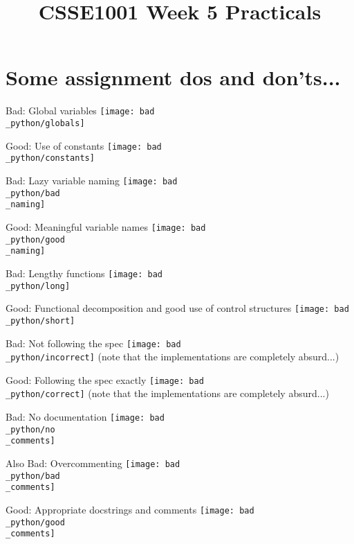 \documentclass[week2]{csse1001}
\title{CSSE1001 Week 5 Practicals}
\begin{document}
\begin{frame} 
\maketitle
\end{frame}

\section{Some assignment dos and don'ts...}

\begin{topic}{Bad: Global variables}
\texttt{[image: bad\\\_python/globals]}
\end{topic}

\begin{topic}{Good: Use of constants}
\texttt{[image: bad\\\_python/constants]}
\end{topic}

\begin{topic}{Bad: Lazy variable naming}
\texttt{[image: bad\\\_python/bad\\\_naming]}
\end{topic}

\begin{topic}{Good: Meaningful variable names}
\texttt{[image: bad\\\_python/good\\\_naming]}
\end{topic}

\begin{topic}{Bad: Lengthy functions}
\texttt{[image: bad\\\_python/long]}
\end{topic}

\begin{topic}{Good: Functional decomposition and good use of control structures}
\texttt{[image: bad\\\_python/short]}
\end{topic}

\begin{topic}{Bad: Not following the spec}
\texttt{[image: bad\\\_python/incorrect]}
(note that the implementations are completely absurd...)
\end{topic}

\begin{topic}{Good: Following the spec exactly}
\texttt{[image: bad\\\_python/correct]}
(note that the implementations are completely absurd...)
\end{topic}

\begin{topic}{Bad: No documentation}
\texttt{[image: bad\\\_python/no\\\_comments]}
\end{topic}

\begin{topic}{Also Bad: Overcommenting}
\texttt{[image: bad\\\_python/bad\\\_comments]}
\end{topic}

\begin{topic}{Good: Appropriate docstrings and comments}
\texttt{[image: bad\\\_python/good\\\_comments]}
\end{topic}
\end{document}
